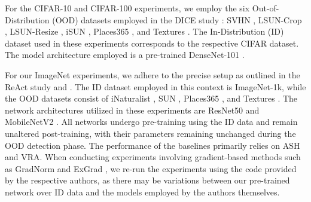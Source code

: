 \documentclass{article}
\begin{document}
For the CIFAR-10 and CIFAR-100 experiments, we employ the six Out-of-Distribution (OOD) datasets employed in the DICE study \cite{sun2022dice}: SVHN \cite{netzer2011reading}, LSUN-Crop \cite{yu2015lsun}, LSUN-Resize \cite{yu2015lsun}, iSUN \cite{xu2015turkergaze}, Places365 \cite{zhou2017places}, and Textures \cite{cimpoi2014describing}. The In-Distribution (ID) dataset used in these experiments corresponds to the respective CIFAR dataset. The model architecture employed is a pre-trained DenseNet-101 \cite{huang2017densely}.

For our ImageNet experiments, we adhere to the precise setup as outlined in the ReAct study \cite{react} and \cite{djurisic2022extremely}. The ID dataset employed in this context is ImageNet-1k, while the OOD datasets consist of iNaturalist \cite{van2018inaturalist}, SUN \cite{xiao2010sun}, Places365 \cite{zhou2017places}, and Textures \cite{cimpoi2014describing}. The network architectures utilized in these experiments are ResNet50 \cite{he2016deep} and MobileNetV2 \cite{sandler2018mobilenetv2}. All networks undergo pre-training using the ID data and remain unaltered post-training, with their parameters remaining unchanged during the OOD detection phase. The performance of the baselines primarily relies on ASH and VRA. When conducting experiments involving gradient-based methods such as GradNorm \cite{huang2021importance} and ExGrad \cite{igoe2022useful}, we re-run the experiments using the code provided by the respective authors, as there may be variations between our pre-trained network over ID data and the models employed by the authors themselves.

\begin{table}[hbt!]
\centering
{}

\caption{The datasets and models we used in our OOD experiments range from moderate to large scale, including evaluations of up to 10 OOD datasets and three architectures.}
\label{benchmarks_table}
\end{table}
\end{document}
